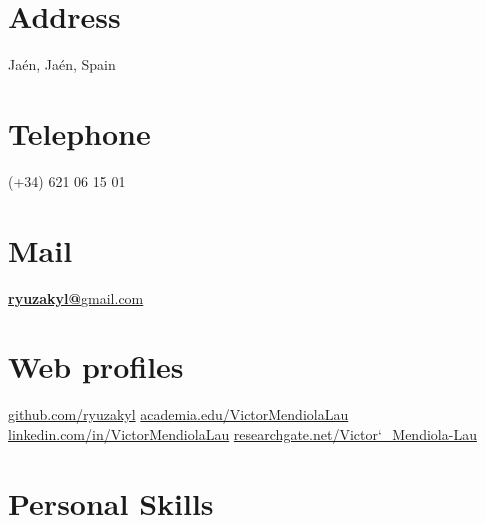 \documentclass[]{friggeri-cv}
\begin{document}
      

\begin{aside}
  \section{Address}
    Jaén, Jaén, Spain
    ~
    ~
    ~
  \section{Telephone}
    (+34) 621 06 15 01
    ~
    ~
    ~
  \section{Mail}
    \href{mailto:ryuzakyl@gmail.com}{\textbf{ryuzakyl@}gmail.com}
	~
	~    
    ~
  \section{Web profiles}
    \href{https://github.com/ryuzakyl}{{\scriptsize github.com/ryuzakyl}}
    \href{https://independent.academia.edu/VictorMendiolaLau}{{\scriptsize academia.edu/VictorMendiolaLau}}
    \href{https://www.linkedin.com/in/VictorMendiolaLau}{{\scriptsize linkedin.com/in/VictorMendiolaLau}}
	\href{https://www.researchgate.net/profile/Victor_Mendiola-Lau}{{\scriptsize researchgate.net/Victor\char`_Mendiola-Lau}}
    ~
    ~
    ~
  \section{Personal Skills}
    ~
\end{aside}
\end{document}
